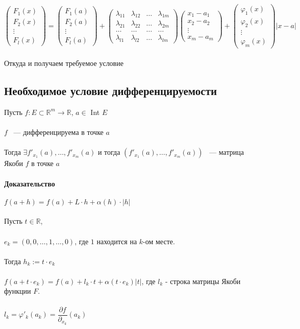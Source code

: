 \documentclass[../main.tex]{subfiles}
\begin{document}
$\begin{pmatrix} F_1(x) \\ F_2(x) \\ \vdots \\ F_l(x) \end{pmatrix} = \begin{pmatrix} F_1(a) \\ F_2(a) \\ \vdots \\ F_l(a) \end{pmatrix} + \begin{pmatrix} \lambda_{11} & \lambda_{12} & \ldots & \lambda_{1m} \\ \lambda_{21} & \lambda_{22} & \ldots & \lambda_{2m} \\ \ldots & \ldots & \ldots & \ldots \\ \lambda_{l1} & \lambda_{l2} & \ldots & \lambda_{lm} \end{pmatrix} \begin{pmatrix} x_1 - a_1 \\ x_2 - a_2 \\ \vdots \\ x_m - a_m \end{pmatrix} + \begin{pmatrix} \varphi_1(x) \\ \varphi_2(x) \\ \vdots \\ \varphi_m(x) \end{pmatrix} |x - a|$\\\\
Откуда и получаем требуемое условие
\newpage

\subsection{Необходимое условие дифференцируемости}
Пусть $f : E \subset \mathbb{R}^m \rightarrow \mathbb{R}$, $a \in$ Int $E$\\\\
$f$ ~--- дифференцируема в точке $a$\\\\
Тогда $\exists f'_{x_1}(a), \ldots, f'_{x_m}(a)$ и тогда $(f'_{x_1}(a), \ldots, f'_{x_m}(a))$ ~--- матрица Якоби $f$ в точке $a$\\\\
\textbf{Доказательство}\\\\
$f(a + h) = f(a) + L \cdot h + \alpha(h) \cdot |h|$\\\\
Пусть $t \in \mathbb{R}$, \\\\
$e_k = (0, 0, \ldots, 1, \ldots, 0)$, где $1$ находится на $k$-ом месте.\\\\
Тогда $h_k := t \cdot e_k$\\\\
$f(a + t \cdot e_k) = f(a) + l_k \cdot t + \alpha(t \cdot e_k) |t|$, где $l_k$ - строка матрицы Якоби функции $F$.\\\\
$l_k = \varphi'_k (a_k) = \dfrac{\partial f}{\partial_{x_k}} (a_k)$
\newpage
\end{document}
